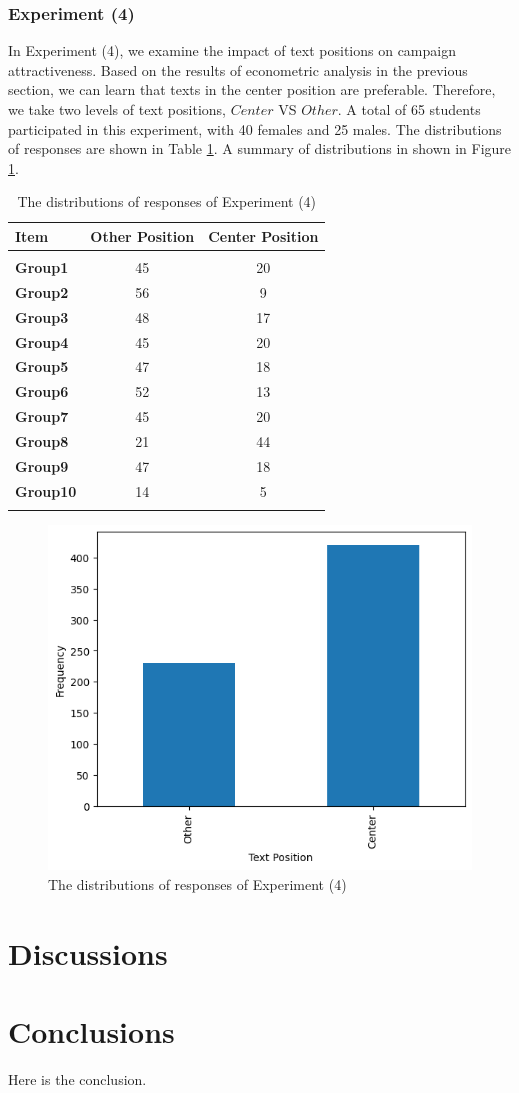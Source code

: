 \documentclass[a4paper]{article}
\begin{document}
\subsubsection{Experiment (4)}
In Experiment (4), we examine the impact of text positions on campaign attractiveness. Based on the results of econometric analysis in the previous section, we can learn that texts in the center position are preferable. Therefore, we take two levels of text positions, $Center$ VS $Other$. A total of 65 students participated in this experiment, with 40 females and 25 males. The distributions of responses are shown in Table \ref{tab: DistExperiment6}. A summary of distributions in shown in Figure \ref{fig:DistExperiment6}.

\begin{table}
\caption{The distributions of responses of Experiment (4)}
\label{tab: DistExperiment6}
\centering

\begin{tabular}{l c c}
\hline
\textbf{Item} & \textbf{Other Position} & \textbf{Center Position} \\
\hline \\[-1.8ex]
\textbf{Group1} & 45 & 20 \\
\textbf{Group2} & 56 & 9 \\
\textbf{Group3} & 48 & 17 \\
\textbf{Group4} & 45 & 20 \\
\textbf{Group5} & 47 & 18 \\
\textbf{Group6} & 52 & 13 \\
\textbf{Group7} & 45 & 20 \\
\textbf{Group8} & 21 & 44 \\
\textbf{Group9} & 47 & 18 \\
\textbf{Group10} & 14 & 5 \\
\hline \\[-1.8ex]
\end{tabular}

\end{table}
\begin{figure}
    \centering
    \includegraphics[width=0.75\linewidth]{distexperiment6.png}
    \caption{The distributions of responses of Experiment (4)}
    \label{fig:DistExperiment6}
\end{figure}



\section{Discussions}
\section{Conclusions}
Here is the conclusion.
\printbibliography
\end{document}
